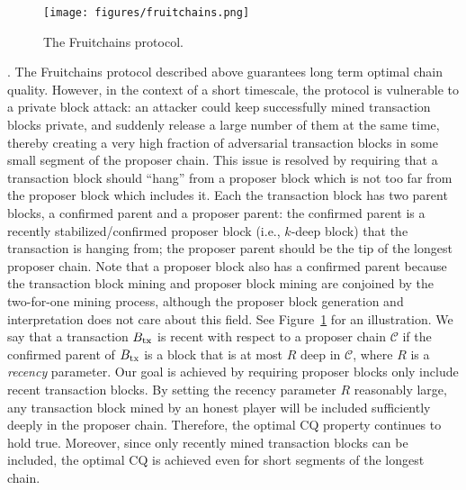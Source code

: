 \documentclass{article}
\begin{document}
\begin{figure}
    \centering
    \texttt{[image: figures/fruitchains.png]}
    \caption{The Fruitchains protocol. }
    \label{fig:fruit}
    \vspace{-0.2in}
\end{figure}

. The Fruitchains protocol described above guarantees long term optimal chain quality. However, in the context of a short timescale, the protocol is vulnerable to a private  block attack: an attacker could keep successfully mined transaction blocks private, and suddenly release a large number of them at the same time, thereby creating a very high fraction of adversarial transaction blocks in some small segment of the proposer chain. This issue is  resolved by  requiring that a transaction block should ``hang'' from a proposer block which is not too far from the proposer block which includes it.  Each  the transaction block has  two parent blocks, a  confirmed parent and a proposer parent: the confirmed parent is a recently stabilized/confirmed proposer block (i.e., $k$-deep block) that the transaction is hanging from; the proposer parent should be the tip of the longest proposer chain. Note that a proposer block  also has a confirmed parent because the transaction block mining and proposer block mining are conjoined  by the two-for-one mining process, although the proposer block generation and interpretation does not care about this field. See Figure~\ref{fig:fruit} for an illustration. We say that a transaction $B_{\rm tx}$ is recent with respect to a proposer chain $\mathcal{C}$ if the confirmed parent of $B_{\rm tx}$ is a block that is at most $R$ deep in $\mathcal{C}$, where $R$ is a {\em recency} parameter. Our goal is achieved by requiring  proposer blocks only include recent transaction blocks. By setting the recency parameter $R$ reasonably large, any transaction block mined by an honest player will be included sufficiently deeply in the proposer chain. Therefore, the optimal CQ property continues to hold true. Moreover, since only recently mined transaction blocks can be included, the optimal CQ is achieved even for  short segments of the longest chain. 
\end{document}
